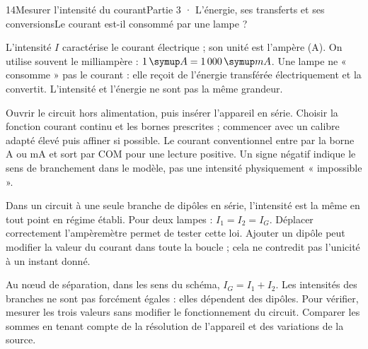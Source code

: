 \begin{ouverture}[college3]{14}{Mesurer l’intensité du courant}{Partie 3 · L’énergie, ses transferts et ses conversions}{Le courant est-il consommé par une lampe ?}
\end{ouverture}
\label{ess-14}
L’intensité $I$ caractérise le courant électrique ; son unité est l’ampère (A). On utilise souvent le milliampère : $1\unite A=1\,000\unite{mA}$. Une lampe ne « consomme » pas le courant : elle reçoit de l’énergie transférée électriquement et la convertit. L’intensité et l’énergie ne sont pas la même grandeur.\par
{}
Ouvrir le circuit hors alimentation, puis insérer l’appareil en série. Choisir la fonction courant continu et les bornes prescrites ; commencer avec un calibre adapté élevé puis affiner si possible. Le courant conventionnel entre par la borne A ou mA et sort par COM pour une lecture positive. Un signe négatif indique le sens de branchement dans le modèle, pas une intensité physiquement « impossible ».\par
\clearpage
{}
Dans un circuit à une seule branche de dipôles en série, l’intensité est la même en tout point en régime établi. Pour deux lampes : $I_1=I_2=I_G$. Déplacer correctement l’ampèremètre permet de tester cette loi. Ajouter un dipôle peut modifier la valeur du courant dans toute la boucle ; cela ne contredit pas l’unicité à un instant donné.\par
{}
Au nœud de séparation, dans les sens du schéma, $I_G=I_1+I_2$. Les intensités des branches ne sont pas forcément égales : elles dépendent des dipôles. Pour vérifier, mesurer les trois valeurs sans modifier le fonctionnement du circuit. Comparer les sommes en tenant compte de la résolution de l’appareil et des variations de la source.\par
